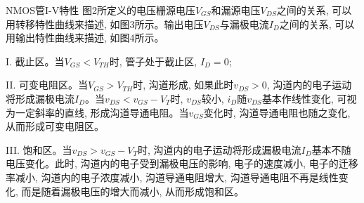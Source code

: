\documentclass[10pt, a4paper]{article} %
\begin{document}
NMOS管I-V特性
\vspace{0.5cm}
图2所定义的电压栅源电压\(V_{GS}\)和漏源电压\(V_{DS}\)之间的关系, 可以用转移特性曲线来描述, 如图3所示。输出电压\(V_{DS}\)与漏极电流\(I_{D}\)之间的关系, 可以用输出特性曲线来描述, 如图4所示。

I. 截止区。当\(V_{GS} < V_{TH}\)时, 管子处于截止区, \(I_{D} = 0\);

II. 可变电阻区。当\(V_{GS} > V_{TH}\)时, 沟道形成, 如果此时\(v_{DS} > 0\), 沟道内的电子运动将形成漏极电流\(I_{D}\)。当\(v_{DS} < v_{GS} - V_T\)时, \(v_{DS}\)较小, $i_{D}$随$v_{DS}$基本作线性变化, 可视为一定斜率的直线, 形成沟道导通电阻。当$v_{GS}$变化时, 沟道导通电阻也随之变化, 从而形成可变电阻区。

III. 饱和区。当\(v_{DS} > v_{GS} - V_T\)时, 沟道内的电子运动将形成漏极电流\(I_{D}\)基本不随电压变化。此时, 沟道内的电子受到漏极电压的影响, 电子的速度减小, 电子的迁移率减小, 沟道内的电子浓度减小, 沟道导通电阻增大, 沟道导通电阻不再是线性变化, 而是随着漏极电压的增大而减小, 从而形成饱和区。
\end{document}

